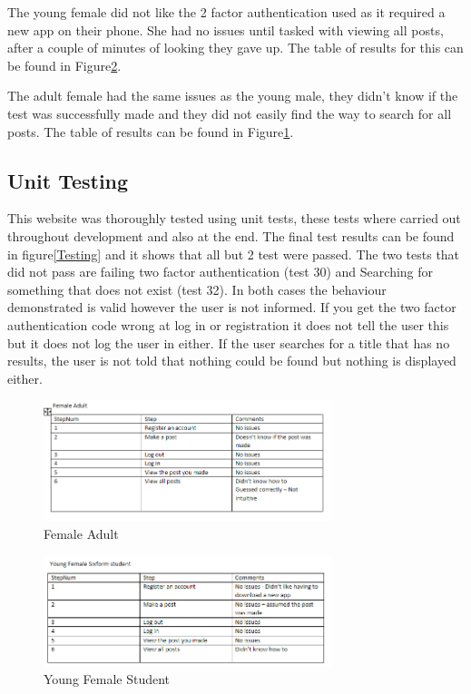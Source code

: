 \documentclass{cmpstyle}
\begin{document}
The young female did not like the 2 factor authentication used as it required a new app on their phone. She had no issues until tasked with viewing all posts, after a couple of minutes of looking they gave up. The table of results for this can be found in Figure\ref{YFemale}.

The adult female had the same issues as the young male, they didn't know if the test was successfully made and they did not easily find the way to search for all posts. The table of results can be found in Figure\ref{Female}.
\subsection{Unit Testing}
This website was thoroughly tested using unit tests, these tests where carried out throughout development and also at the end. The final test results can be found in figure\ref{Testing} and it shows that all but 2 test were passed. The two tests that did not pass are failing two factor authentication (test 30) and Searching for something that does not exist (test 32). In both cases the behaviour demonstrated is valid however the user is not informed. If you get the two factor authentication code wrong at log in or registration it does not tell the user this but it does not log the user in either. If the user searches for a title that has no results, the user is not told that nothing could be found but nothing is displayed either.
\clearpage
\appendix
\begin{figure}[htb]
	\centering
	\includegraphics[width=0.75\textwidth]{Female.png}
	\caption{Female Adult \label{Female}}
\end{figure}
\begin{figure}[htb]
	\centering
	\includegraphics[width=0.75\textwidth]{Young female.png}
	\caption{Young Female Student \label{YFemale}}
\end{figure}
\end{document}
